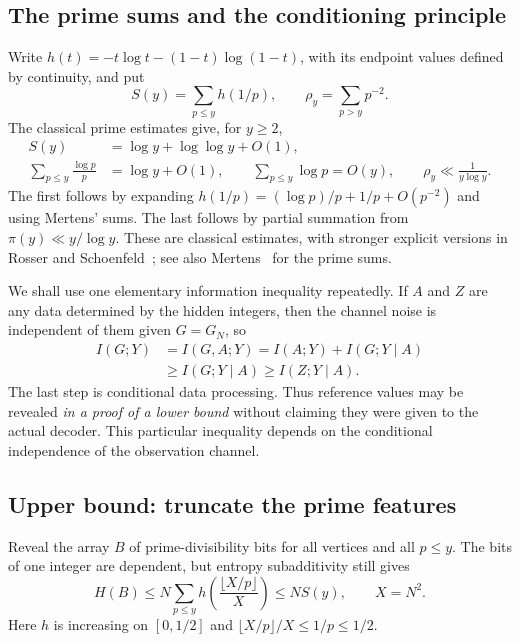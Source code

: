 \subsection{The prime sums and the conditioning principle}

Write $h(t)=-t\log t-(1-t)\log(1-t)$, with its endpoint values defined
by continuity, and put
\[
 S(y)=\sum_{p\le y}h(1/p),\qquad \rho_y=\sum_{p>y}p^{-2}.
\]
The classical prime estimates give, for $y\ge2$,
\begin{equation}\label{rec:prime-estimates}
 \begin{split}
 S(y)&=\log y+\log\log y+O(1),\\
 \sum_{p\le y}\frac{\log p}{p}&=\log y+O(1),\qquad
 \sum_{p\le y}\log p=O(y),\qquad
 \rho_y\ll\frac1{y\log y}.
 \end{split}
\end{equation}
The first follows by expanding
$h(1/p)=(\log p)/p+1/p+O(p^{-2})$ and using Mertens' sums.
The last follows by partial summation from $\pi(y)\ll y/\log y$.
These are classical estimates, with stronger explicit versions in
Rosser and Schoenfeld~\cite{RecRosserSchoenfeld1962}; see also
Mertens~\cite{RecMertens1874} for the prime sums.

We shall use one elementary information inequality repeatedly. If $A$
and $Z$ are any data determined by the hidden integers, then the channel
noise is independent of them given $G=G_N$, so
\begin{equation}\label{rec:oracle-information}
 \begin{split}
 I(G;Y)&=I(G,A;Y)
       =I(A;Y)+I(G;Y\mid A)\\
       &\ge I(G;Y\mid A)\ge I(Z;Y\mid A).
 \end{split}
\end{equation}
The last step is conditional data processing. Thus reference values may
be revealed \emph{in a proof of a lower bound} without claiming they
were given to the actual decoder. This particular inequality depends
on the conditional independence of the observation channel.

\subsection{Upper bound: truncate the prime features}

Reveal the array $B$ of prime-divisibility bits for all vertices and
all $p\le y$. The bits of one integer are dependent, but entropy
subadditivity still gives
\begin{equation}\label{rec:bit-entropy}
 H(B)\le N\sum_{p\le y}h\left(\frac{\lfloor X/p\rfloor}{X}\right)
 \le NS(y),\qquad X=N^2.
\end{equation}
Here $h$ is increasing on $[0,1/2]$ and
$\lfloor X/p\rfloor/X\le1/p\le1/2$.

